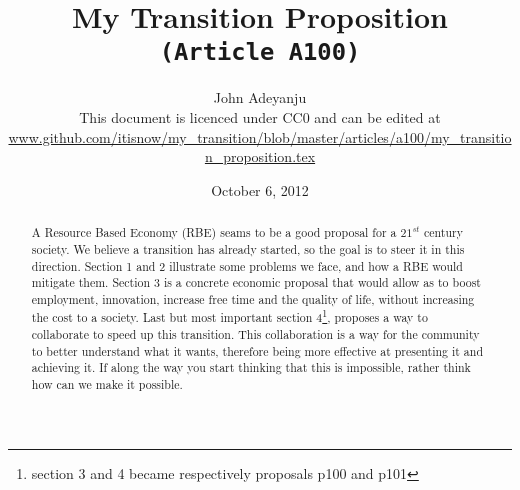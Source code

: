\documentclass{article}
\begin{document}
\title{My Transition Proposition\\\tt{\small{(Article A100)}}\\\tt{\small{}}}%
\author{John Adeyanju\\\small{This document is licenced under CC0 and can be edited at}\\ \scriptsize{\url{www.github.com/itisnow/my_transition/blob/master/articles/a100/my_transition_proposition.tex}}}
\date{October 6, 2012}

\maketitle

\begin{abstract}
A Resource Based Economy (RBE) seams to be a good proposal for a $21^{st}$ century society.
We believe a transition has already started, so the goal is to steer it in this direction.
Section 1 and 2 illustrate some problems we face, and how a RBE would mitigate them.
Section 3 is a concrete economic proposal that would allow as to boost employment, innovation, increase free time and the quality of life, without increasing the cost to a society.
Last but most important section 4\footnote{section 3 and 4 became respectively proposals p100 and p101}, proposes a way to collaborate to speed up this transition.
This collaboration is a way for the community to better understand what it wants, therefore being more effective at presenting it and achieving it.
If along the way you start thinking that this is impossible, rather think how can we make it possible.
\end{abstract}
\end{document}
